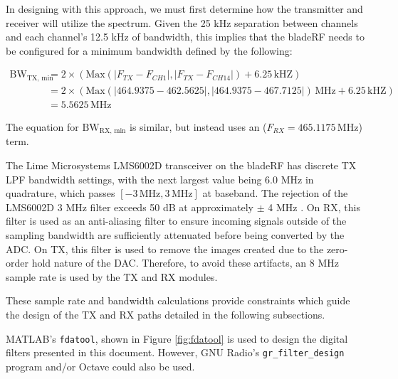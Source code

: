 In designing with this approach, we must first determine how the transmitter and
receiver will utilize the spectrum.  Given the 25 kHz separation between
channels and each channel's 12.5 kHz of bandwidth, this implies that the
bladeRF needs to be configured for a minimum bandwidth defined by the
following:

\begin{align*}
  \text{BW}_{\text{TX, min}} &=
  2 \times \left( \text{Max}\left(|F_{TX} - F_{CH1}|, |F_{TX} - F_{CH14}|\right) + 6.25 \,\text{kHZ} \right) \\
  &= 2 \times \left( \text{Max}\left(|464.9375 - 462.5625|, |464.9375 - 467.7125|\right) \, \text{MHz} + 6.25 \,\text{kHZ} \right) \\
  &= 5.5625 \, \text{MHz}
\end{align*}

The equation for $\text{BW}_{\text{RX, min}}$ is similar, but instead uses an
($F_{RX} = 465.1175 \,\text{MHz}$) term.

The Lime Microsystems LMS6002D transceiver \cite{LMS6002D_OVERVIEW} on the bladeRF has
discrete TX \ac{LPF} bandwidth settings, with the next largest value being 6.0
MHz in quadrature, which passes $[-3 \,\text{MHz}, 3 \,\text{MHz}]$ at baseband. The
rejection of the LMS6002D 3 MHz filter exceeds 50 dB at approximately $\pm$ 4
MHz \cite{LMS6002D_DATASHEET}. On RX, this filter is used as an anti-aliasing filter
to ensure incoming signals outside of the sampling bandwidth are sufficiently
attenuated before being converted by the ADC.  On TX, this filter is used to
remove the images created due to the zero-order hold nature of the DAC.
Therefore, to avoid these artifacts, an 8 MHz sample rate is used by the
\ac{TX} and \ac{RX} modules.

These sample rate and bandwidth calculations provide constraints which guide
the design of the \ac{TX} and \ac{RX} paths detailed in the following subsections.

MATLAB's \texttt{fdatool}, shown in Figure \ref{fig:fdatool} is used to design
the digital filters presented in this document. However, GNU Radio's
\texttt{gr\_filter\_design} program and/or Octave could also be used.

